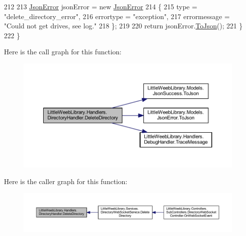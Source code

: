 \begin{DoxyCode}
212 
213                 \mbox{\hyperlink{class_little_weeb_library_1_1_models_1_1_json_error}{JsonError}} jsonError = \textcolor{keyword}{new} \mbox{\hyperlink{class_little_weeb_library_1_1_models_1_1_json_error}{JsonError}}
214                 \{
215                     type = \textcolor{stringliteral}{"delete\_directory\_error"},
216                     errortype = \textcolor{stringliteral}{"exception"},
217                     errormessage = \textcolor{stringliteral}{"Could not get drives, see log."}
218                 \};
219 
220                 \textcolor{keywordflow}{return} jsonError.\mbox{\hyperlink{class_little_weeb_library_1_1_models_1_1_json_error_a0e3e7dd2e2990404b7f0461742b23440}{ToJson}}();
221             \}
222         \}
\end{DoxyCode}
Here is the call graph for this function\+:\nopagebreak
\begin{figure}[H]
\begin{center}
\leavevmode
\includegraphics[width=350pt]{class_little_weeb_library_1_1_handlers_1_1_directory_handler_aeae514c438e071fe95c42ff74e0fef9d_cgraph}
\end{center}
\end{figure}
Here is the caller graph for this function\+:\nopagebreak
\begin{figure}[H]
\begin{center}
\leavevmode
\includegraphics[width=350pt]{class_little_weeb_library_1_1_handlers_1_1_directory_handler_aeae514c438e071fe95c42ff74e0fef9d_icgraph}
\end{center}
\end{figure}
\mbox{\label{class_little_weeb_library_1_1_handlers_1_1_directory_handler_a6be1b158ee280e8a74a49917a90484e2}} 
